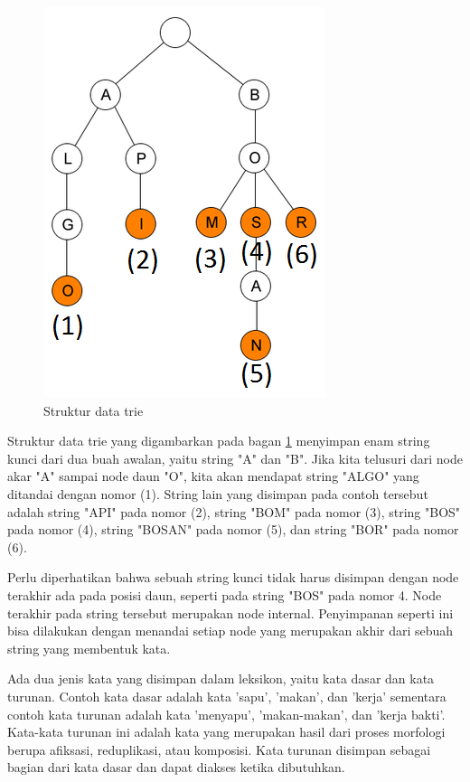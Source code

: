 \begin{figure}[H]
\centering
\includegraphics[scale=0.75]{Gambar/gambar-trie}
\caption[Struktur data trie]{Struktur data trie} 
\label{bagan-trie}
\end{figure}

Struktur data trie yang digambarkan pada bagan \ref{bagan-trie} menyimpan enam string kunci dari dua buah awalan, yaitu string "A" dan "B". Jika kita telusuri dari node akar "A" sampai node daun "O", kita akan mendapat string "ALGO" yang ditandai dengan nomor (1). String lain yang disimpan pada contoh tersebut adalah string "API" pada nomor (2), string "BOM" pada nomor (3), string "BOS" pada nomor (4), string "BOSAN" pada nomor (5), dan string "BOR" pada nomor (6).

Perlu diperhatikan bahwa sebuah string kunci tidak harus disimpan dengan node terakhir ada pada posisi daun, seperti pada string "BOS" pada nomor 4. Node terakhir pada string tersebut merupakan node internal. Penyimpanan seperti ini bisa dilakukan dengan menandai setiap node yang merupakan akhir dari sebuah string yang membentuk kata.

Ada dua jenis kata yang disimpan dalam leksikon, yaitu kata dasar dan kata turunan. Contoh kata dasar adalah kata 'sapu', 'makan', dan 'kerja' sementara contoh kata turunan adalah kata 'menyapu', 'makan-makan', dan 'kerja bakti'. Kata-kata turunan ini adalah kata yang merupakan hasil dari proses morfologi berupa afiksasi, reduplikasi, atau komposisi. Kata turunan disimpan sebagai bagian dari kata dasar dan dapat diakses ketika dibutuhkan. 


